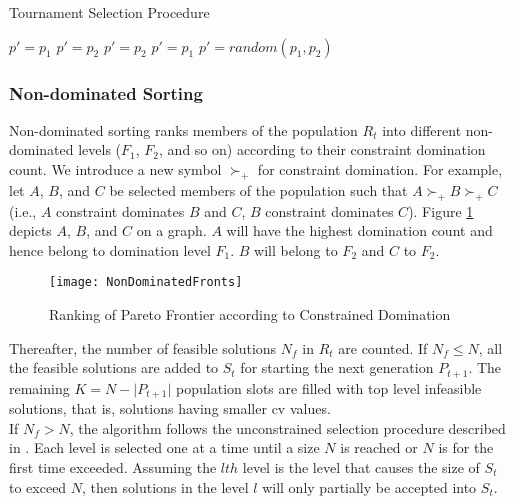 \begin{algorithm}[h!]
  \caption{Tournament Selection Procedure}\label{alg:tournament_selection}
    {
        $p' = p_1$
    }
    {
        $p' = p_2$
    }
    {
        {
            $p' = p_2$
        }
        {
            $p' = p_1$
        }
    }
    {
        $p' = random(p_1, p_2)$
    }
    
  \end{algorithm}

\subsubsection{Non-dominated Sorting}
Non-dominated sorting ranks members of the population $R_t$ into different non-dominated levels ($F_1$, $F_2$, and so on) according to their constraint domination count. We introduce a new symbol $\succ_+$ for constraint domination. For example, let $A$, $B$, and $C$ be selected members of the population  such that $A \succ_+ B \succ_+ C$ (i.e., $A$ constraint dominates $B$ and $C$, $B$ constraint dominates $C$). Figure \ref{fig:paretolevels} depicts $A$, $B$, and $C$ on a graph. $A$ will have the highest domination count and hence belong to domination level $F_1$. $B$ will belong to $F_2$ and $C$ to $F_2$. 

\begin{figure}
\centering
\texttt{[image: NonDominatedFronts]}
\caption{Ranking of Pareto Frontier according to Constrained Domination}\label{fig:paretolevels}
\end{figure}

Thereafter, the number of feasible solutions $N_f$ in $R_t$ are counted. If $N_f \leq N$, all the feasible solutions are added to $S_t$ for starting the next generation $P_{t+1}$. The remaining $K = N - \lvert P_{t+1} \rvert$ population slots are filled with top level infeasible solutions, that is, solutions having smaller \gls{cv} values.\\
If $N_f > N$, the algorithm follows the unconstrained selection procedure described in \parencite{Deb2013AnConstraints}. Each level is selected one at a time until a size $N$ is reached or $N$ is for the first time exceeded. Assuming the $lth$ level is the level that causes the size of $S_t$ to exceed $N$, then solutions in the level $l$ will only partially be accepted into $S_t$. 

